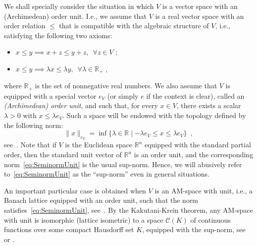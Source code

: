 \documentclass[a4paper,11pt]{amsart}
\theoremstyle{definition}
\theoremstyle{remark}
\begin{document}
We shall specially consider the situation in which $V$ is a vector space with an (Archimedean) order unit.
I.e., we assume that $V$ is a real vector space with an order relation ${\leqslant}$ that is compatible with the algebraic structure of $V$, i.e., satisfying the following two axioms:
\begin{itemize}
  \item $x {\leqslant} y \implies x+z {\leqslant} y+z, \enspace \forall z \in V$ ;
  \item $x {\leqslant} y \implies \lambda x {\leqslant} \lambda y, \enspace \forall \lambda \in {\mathbb{R}}_+$ ,
\end{itemize}
where ${\mathbb{R}}_+$ is the set of nonnegative real numbers.
We also assume that $V$ is equipped with a special vector ${e}_V$ (or simply ${e}$ if the context is clear), called an {\em (Archimedean) order unit}, and such that, for every $x \in V$, there exists a scalar $\lambda > 0$ with $x {\leqslant} \lambda {e}_V$.
Such a space will be endowed with the topology defined by the following norm:
\begin{equation}
  \label{eq:SeminormUnit}
  \|x\|_{e_V} = \inf \{ \lambda \in {\mathbb{R}} \mid -\lambda {e}_V {\leqslant} x {\leqslant} \lambda {e}_V \} \enspace ,
\end{equation}
see~\cite{PT09}.
Note that if $V$ is the Euclidean space ${\mathbb{R}}^n$ equipped with the standard partial order, then the standard unit vector of ${\mathbb{R}}^n$ is an order unit, and the corresponding norm~\eqref{eq:SeminormUnit} is the usual sup-norm. Hence, we will abusively refer to~\eqref{eq:SeminormUnit} as the ``sup-norm'' even in general situations.

An important particular case is obtained when $V$ is an AM-space with unit, i.e., a Banach lattice equipped with an order unit, such that the norm satisfies~\eqref{eq:SeminormUnit}, see~\cite{AB06}.
By the Kakutani-Krein theorem, any AM-space with unit is isomorphic (lattice isometric) to a space $\mathcal{C}(K)$ of continuous functions over some compact Hausdorff set $K$, equipped with the sup-norm,
see~\cite[Theorem~8.29]{AB06} or \cite[Chapter II, Theorem~7.4]{Sch74}.
\end{document}
